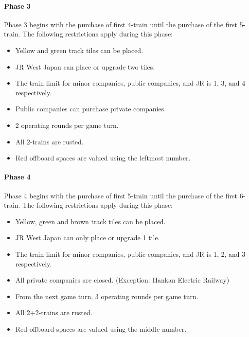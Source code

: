 \documentclass{article}
\begin{document}
\begin{CJK}{UTF8}{min}
\begin{multicols}{2}
\paragraph*{Phase 3}
Phase 3 begins with the purchase of first 4-train until the
purchase of the first 5-train. The following restrictions apply during
this phase:
\begin{itemize}
\item Yellow and green track tiles can be placed.
\item JR West Japan can place or upgrade two tiles.
\item The train limit for minor companies, public companies, and JR is
  1, 3, and 4 respectively.
\item Public companies can purchase private companies.
\item 2 operating rounds per game turn.
\item All 2-trains are rusted.
\item Red offboard spaces are valued using the leftmost number.
\end{itemize}

\paragraph*{Phase 4}
Phase 4 begins with the purchase of first 5-train until the
purchase of the first 6-train. The following restrictions apply during
this phase:
\begin{itemize}
\item Yellow, green and brown track tiles can be placed.
\item JR West Japan can only place or upgrade 1 tile.
\item The train limit for minor companies, public companies, and JR is
  1, 2, and 3 respectively.
\item All private companies are closed. (Exception: Hankan Electric Railway)
\item From the next game turn, 3 operating rounds per game turn.
\item All 2+2-trains are rusted.
\item Red offboard spaces are valued using the middle number.
\end{itemize}


\end{multicols}
\end{CJK}
\end{document}
